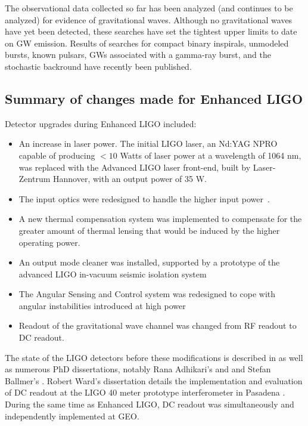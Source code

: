 The observational data collected so far has been analyzed (and
continues to be analyzed) for evidence of gravitational waves.
Although no gravitational waves have yet been detected, these searches
have set the tightest upper limits to date on GW emission.  Results of
searches for compact binary inspirals\cite{S5CBCnospin, S5CBC5months},
unmodeled bursts\cite{S5burst}, known pulsars\cite{S5knownpulsars},
GWs associated with a gamma-ray burst\cite{S5GRB070201},
and the stochastic backround\cite{S5NatureStochastic} have recently
been published.

\subsection{Summary of changes made for Enhanced LIGO}


Detector upgrades during Enhanced LIGO included:
\begin{itemize}
\item An increase in laser power.  The initial LIGO laser, an Nd:YAG
  NPRO capable of producing $< 10$ Watts of laser power at a
  wavelength of 1064 nm, was replaced with the Advanced LIGO laser
  front-end, built by Laser-Zentrum Hannover, with an output power of 35 W.
\item The input optics were redesigned to handle the higher input
  power~\cite{DooleyCharacterization,Quetschke2008ElectroOptic}.  
\item A new thermal compensation system was implemented to compensate
  for the greater amount of thermal lensing that would be induced by
  the higher operating power.
\item An output mode cleaner was installed, supported by a prototype
  of the advanced LIGO in-vacuum seismic isolation system~\cite{KisselThesis}
\item The Angular Sensing and Control system was redesigned to cope
  with angular instabilities introduced at high
  power~\cite{Sidles2006Optical,DooleyAngular}
\item Readout of the gravitational wave channel was changed from RF
  readout to DC readout.
\end{itemize}

The state of the LIGO detectors before these modifications is
described in \cite{S5InstrumentPaper} as well as numerous PhD
dissertations, notably Rana Adhikari's \cite{RanaThesis} and and
Stefan Ballmer's \cite{Ballmer2006LIGO}.  Robert Ward's dissertation
details the implementation and evaluation of DC readout at the LIGO 40
meter prototype interferometer in Pasadena \cite{RobWardThesis}.
%
During the same time as Enhanced LIGO, DC readout was simultaneously
and independently implemented at GEO\cite{GeoDC,Degallaix2010Commissioning}.

